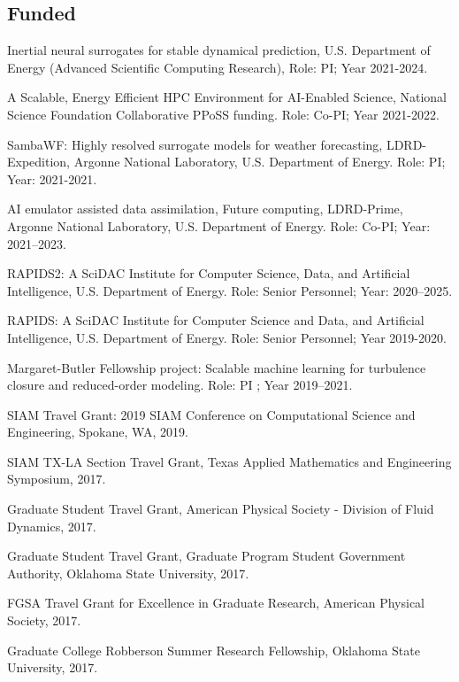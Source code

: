 \documentclass[letterpaper]{article}
\renewenvironment{itemize}{
  \begin{list}{}{
    \setlength{\leftmargin}{1.5em}
  }
}{
  \end{list}
}
\begin{document}
\subsection*{Funded}

\begin{itemize}

  \item Inertial neural surrogates for stable dynamical prediction, U.S. Department of Energy (Advanced Scientific Computing Research), Role: PI; Year 2021-2024. 

  \item A Scalable, Energy Efficient HPC Environment for AI-Enabled Science, National Science Foundation Collaborative PPoSS funding. Role: Co-PI; Year 2021-2022. 

  \item SambaWF: Highly resolved surrogate models for weather forecasting, LDRD-Expedition, Argonne National Laboratory, U.S. Department of Energy. Role: PI; Year: 2021-2021. 

  \item AI emulator assisted data assimilation, Future computing, LDRD-Prime, Argonne National Laboratory, U.S. Department of Energy. Role: Co-PI; Year: 2021--2023.

  \item RAPIDS2: A SciDAC Institute for Computer Science, Data, and Artificial Intelligence, U.S. Department of Energy. Role: Senior Personnel; Year: 2020--2025.

  \item RAPIDS: A SciDAC Institute for Computer Science and Data, and Artificial Intelligence, U.S. Department of Energy. Role: Senior Personnel; Year 2019-2020.

  \item Margaret-Butler Fellowship project: Scalable machine learning for turbulence closure and reduced-order modeling. Role: PI ; Year 2019--2021.

  \item SIAM Travel Grant: 2019 SIAM Conference on Computational Science and Engineering, Spokane, WA, 2019.

  \item SIAM TX-LA Section Travel Grant, Texas Applied Mathematics and Engineering Symposium, 2017.

  \item Graduate Student Travel Grant, American Physical Society - Division of Fluid Dynamics, 2017.

  \item Graduate Student Travel Grant, Graduate Program Student Government Authority, Oklahoma State University, 2017.

  \item FGSA Travel Grant for Excellence in Graduate Research, American Physical Society, 2017.

  \item Graduate College Robberson Summer Research Fellowship, Oklahoma State University, 2017.

\end{itemize}
\end{document}
